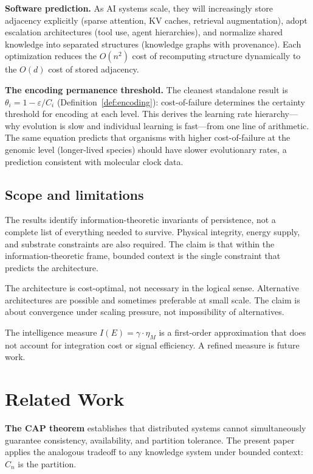 \documentclass[11pt]{article}
\theoremstyle{definition}
\theoremstyle{remark}
\begin{document}
\textbf{Software prediction.}
As AI systems scale, they will increasingly store adjacency explicitly
(sparse attention, KV caches, retrieval augmentation), adopt
escalation architectures (tool use, agent hierarchies), and
normalize shared knowledge into separated structures (knowledge
graphs with provenance). Each optimization reduces the $O(n^2)$
cost of recomputing structure dynamically to the $O(d)$ cost of
stored adjacency.

\textbf{The encoding permanence threshold.}
The cleanest standalone result is
$\theta_i = 1 - \varepsilon / C_i$
(Definition~\ref{def:encoding}): cost-of-failure determines the
certainty threshold for encoding at each level. This derives the
learning rate hierarchy---why evolution is slow and individual
learning is fast---from one line of arithmetic. The same equation
predicts that organisms with higher cost-of-failure at the genomic
level (longer-lived species) should have slower evolutionary rates,
a prediction consistent with molecular clock data.

\subsection{Scope and limitations}

The results identify information-theoretic invariants of persistence,
not a complete list of everything needed to survive. Physical
integrity, energy supply, and substrate constraints are also required.
The claim is that within the information-theoretic frame, bounded
context is the single constraint that predicts the architecture.

The architecture is cost-optimal, not necessary in the logical sense.
Alternative architectures are possible and sometimes preferable
at small scale. The claim is about convergence under scaling
pressure, not impossibility of alternatives.

The intelligence measure $I(E) = \gamma \cdot \eta_M$ is a first-order
approximation that does not account for integration cost or signal
efficiency. A refined measure is future work.

\section{Related Work}
\label{sec:related}

\textbf{The CAP theorem} \cite{Brewer2000, Gilbert2002} establishes
that distributed systems cannot simultaneously guarantee consistency,
availability, and partition tolerance. The present paper applies
the analogous tradeoff to any knowledge system under bounded context:
$C_n$ is the partition.
\end{document}
